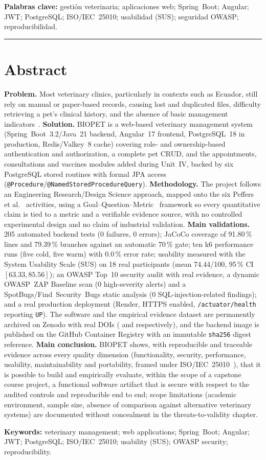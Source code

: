 \textbf{Palabras clave:} gesti\'on veterinaria; aplicaciones web;
Spring~Boot; Angular; JWT; PostgreSQL; ISO/IEC~25010; usabilidad (SUS);
seguridad OWASP; reproducibilidad.

\bigskip
\hrule
\bigskip

\chapter*{Abstract}
\label{cap:abstract}

\textbf{Problem.} Most veterinary clinics, particularly in contexts such as
Ecuador, still rely on manual or paper-based records, causing lost and
duplicated files, difficulty retrieving a pet's clinical history, and the
absence of basic management indicators~\cite{cedeno2021veterinaria}.
\textbf{Solution.} BIOPET is a web-based veterinary management system
(Spring~Boot~3.2/Java~21 backend, Angular~17 frontend, PostgreSQL~18 in
production, Redis/Valkey~8 cache) covering role- and ownership-based
authentication and authorization, a complete pet CRUD, and the
appointments, consultations and vaccines modules added during Unit~IV,
backed by six PostgreSQL stored routines with formal JPA access
(\texttt{@Procedure}/\texttt{@NamedStoredProcedureQuery}).
\textbf{Methodology.} The project follows an Engineering
Research/Design Science approach, mapped onto the six Peffers et
al.~\cite{peffers2007dsrm} activities, using a
Goal--Question--Metric~\cite{vansolingen2002gqm} framework so every
quantitative claim is tied to a metric and a verifiable evidence source, with
no controlled experimental design and no claim of industrial validation.
\textbf{Main validations.} 205 automated backend tests (0 failures, 0
errors); JaCoCo coverage of 91.80\,\% lines and 79.39\,\% branches against
an automatic 70\,\% gate; ten k6 performance runs (five cold, five warm)
with 0.0\,\% error rate; usability measured with the System Usability Scale
(SUS) on 18 real participants (mean 74.44/100, 95\,\% CI $[63.33, 85.56]$);
an OWASP Top~10 security audit with real evidence, a dynamic OWASP~ZAP
Baseline scan (0 high-severity alerts) and a SpotBugs/Find~Security~Bugs
static analysis (0 SQL-injection-related findings); and a real production
deployment (Render, HTTPS enabled, \texttt{/actuator/health} reporting
\texttt{UP}). The software and the empirical evidence dataset are
permanently archived on Zenodo with real DOIs
(\texttt{\doisoftware} and \texttt{\doidataset} respectively), and the
backend image is published on the GitHub Container Registry with an
immutable \texttt{sha256} digest reference. \textbf{Main conclusion.}
BIOPET shows, with reproducible and traceable evidence across every quality
dimension (functionality, security, performance, usability,
maintainability and portability, framed under
ISO/IEC~25010~\cite{iso25010-2011}), that it is possible to build and
empirically evaluate, within the scope of a capstone course project, a
functional software artifact that is secure with respect to the audited
controls and reproducible end to end; scope limitations (academic
environment, sample size, absence of comparison against alternative
veterinary systems) are documented without concealment in the threats-to-validity
chapter.

\textbf{Keywords:} veterinary management; web applications;
Spring~Boot; Angular; JWT; PostgreSQL; ISO/IEC~25010; usability (SUS);
OWASP security; reproducibility.
